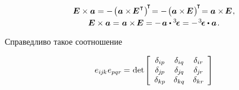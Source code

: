 \begin{otherlanguage}{russian}
\nopagebreak\vspace{-0.25em}\begin{equation}\begin{array}{c}
\bm{E} \times \bm{a}
= - \hspace{.25ex} \bigl( \hspace{.1ex} \bm{a} \times \hspace{-0.25ex} \bm{E}^{\hspace{.1ex}\T} \hspace{.1ex} \bigr)^{\hspace{-0.3ex}\T} \hspace{-0.4ex}
= - \hspace{.25ex} \bigl( \bm{a} \times \hspace{-0.25ex} \bm{E} \hspace{.15ex} \bigr)^{\hspace{-0.25ex}\T} \hspace{-0.4ex}
= \bm{a} \times \hspace{-0.25ex} \bm{E}
\hspace{.15ex} ,
\\[.25em]
%
\bm{E} \times \bm{a} = \hspace{.1ex} \bm{a} \times \hspace{-0.25ex} \bm{E}
= - \hspace{.25ex} \bm{a} \dotp \levicivitatensor
= - \hspace{.2ex} \levicivitatensor \dotp \bm{a}
\hspace{.2ex} .
\vspace{-0.2em}
\end{array}\end{equation}

Справедливо такое соотношение

\nopagebreak\vspace{-0.1em}\begin{equation}\label{doubleveblen}
e_{i\hspace{-0.1ex}j\hspace{-0.1ex}k} \hspace{.1ex} e_{pqr}
\hspace{-0.1ex} = \hspace{.1ex}
\operatorname{det} \hspace{-0.25ex} \left[
\begin{array}{ccc}
\delta_{ip} & \delta_{iq} & \delta_{ir} \\
\delta_{\hspace{-0.1ex}j\hspace{-0.1ex}p} & \delta_{\hspace{-0.1ex}j\hspace{-0.1ex}q} & \delta_{\hspace{-0.1ex}j\hspace{-0.1ex}r} \\
\delta_{kp} & \delta_{kq} & \delta_{kr}
\end{array}\hspace{-0.1ex}
\right]
\end{equation}


\end{otherlanguage}
